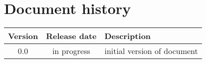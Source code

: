 \chapter{Document history}

\begin{longtable}{ccp{}}
\toprule
Version & Release date & Description \\
\midrule
0.0 & in progress & initial version of document \\
\bottomrule
\end{longtable}



